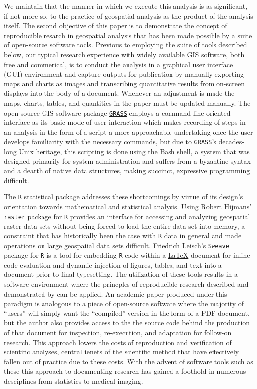 We maintain that the manner in which we execute this analysis is as
significant, if not more so, to the practice of geospatial analysis as
the product of the analysis itself.  The second objective of this
paper is to demonstrate the concept of reproducible resarch in
geospatial analysis that has been made possible by a suite of
open-source software tools.  Previous to employing the suite of tools
described below, our typical research experience with widely available
GIS software, both free and commerical, is to conduct the analysis in
a graphical user interface (GUI) environment and capture outputs for
publication by manually exporting maps and charts as images and
transcribing quantitative results from on-screen displays into the
body of a document.  Whenever an adjustment is made the maps, charts,
tables, and quantities in the paper must be updated manually.  The
open-source GIS software package
\href{http://grass.osgeo.org/}{\texttt{GRASS}} \citep{GRASS} employs a
command-line oriented interface as its basic mode of user interaction
which makes recording of steps in an analysis in the form of a script
a more approachable undertaking once the user develops familiarity
with the necessary commands, but due to \texttt{GRASS}'s decades-long Unix
heritage, this scripting is done using the Bash shell, a system that
was designed primarily for system administration and suffers from a
byzantine syntax and a dearth of native data structures, making
succinct, expressive programming difficult.

The \href{http://www.r-project.org/}{\texttt{R}} statistical package
addresses these shortcomings \citep{R} by virtue of its design's
orientation towards mathematical and statistical analysis.  Using
Robert Hijmans' \citeyearpar{Hijmans2011} \texttt{raster} package for
\texttt{R} provides an interface for accessing and analyzing
geospatial raster data sets without being forced to load the entire
data set into memory, a constraint that has historically been the case
with \texttt{R} data in general and made operations on large
geospatial data sets difficult.  Friedrich Leisch's
\citeyearpar{Leisch2002} \texttt{Sweave} package for \texttt{R} is a
tool for embedding \texttt{R} code within a
\href{http://www.latex-project.org/}{\LaTeX} \citep{Lamport1994}
document for inline code evaluation and dynamic injection of figures,
tables, and text into a document prior to final typesetting.  The
utilization of these tools results in a software environment where the
princples of reproducible research described and demonstrated by
\citet{Gentleman2007} can be applied.  An academic paper produced
under this paradigm is analogous to a piece of open-source software
where the majority of ``users'' will simply want the ``compiled''
version in the form of a PDF document, but the author also provides
access to the the source code behind the production of that document
for inspection, re-execution, and adaptation for follow-on research.
This approach lowers the costs of reproduction and verification of
scientific analyses, central tenets of the scientific method that have
effectively fallen out of practice due to these costs.  With the
advent of software tools such as these this approach to documenting
research has gained a foothold in numerous desciplines from statistics
to medical imaging.

